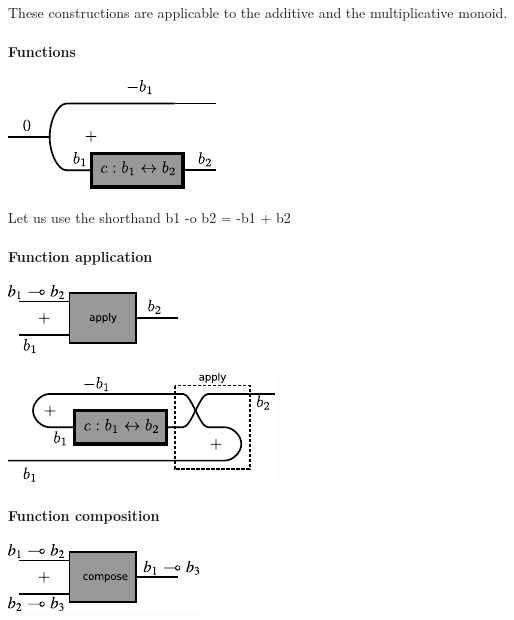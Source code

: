 \documentclass[preprint]{sigplanconf}
\begin{document}
These constructions are applicable to the additive and the
multiplicative monoid.

\paragraph*{Functions}

\begin{center}
  \includegraphics{diagrams/function.pdf}
\end{center}

Let us use the shorthand {{b1 -o b2 = -b1 + b2}}

\paragraph*{Function application}

\begin{center}
  \includegraphics{diagrams/apply1.pdf}
\end{center}

\begin{center}
  \includegraphics{diagrams/apply2.pdf}
\end{center}

\paragraph*{Function composition}

\begin{center}
  \includegraphics{diagrams/compose1.pdf}
\end{center}
\end{document}
